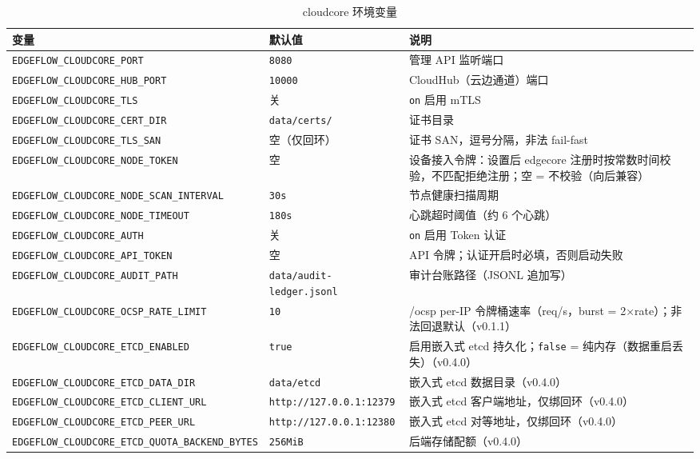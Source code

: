 \begin{table}[htbp]
\centering
\caption{cloudcore 环境变量}
\label{tab:a-cloud}
\begin{tabularx}{\textwidth}{l l X}
\toprule
\textbf{变量} & \textbf{默认值} & \textbf{说明} \\
\midrule
\texttt{EDGEFLOW\_CLOUDCORE\_PORT} & \texttt{8080} & 管理 API 监听端口 \\
\texttt{EDGEFLOW\_CLOUDCORE\_HUB\_PORT} & \texttt{10000} & CloudHub（云边通道）端口 \\
\texttt{EDGEFLOW\_CLOUDCORE\_TLS} & 关 & \texttt{on} 启用 mTLS \\
\texttt{EDGEFLOW\_CLOUDCORE\_CERT\_DIR} & \texttt{data/certs/} & 证书目录 \\
\texttt{EDGEFLOW\_CLOUDCORE\_TLS\_SAN} & 空（仅回环） & 证书 SAN，逗号分隔，非法 fail-fast \\
\texttt{EDGEFLOW\_CLOUDCORE\_NODE\_TOKEN} & 空 & 设备接入令牌：设置后 edgecore 注册时按常数时间校验，不匹配拒绝注册；空 = 不校验（向后兼容） \\
\texttt{EDGEFLOW\_CLOUDCORE\_NODE\_SCAN\_INTERVAL} & \texttt{30s} & 节点健康扫描周期 \\
\texttt{EDGEFLOW\_CLOUDCORE\_NODE\_TIMEOUT} & \texttt{180s} & 心跳超时阈值（约 6 个心跳） \\
\texttt{EDGEFLOW\_CLOUDCORE\_AUTH} & 关 & \texttt{on} 启用 Token 认证 \\
\texttt{EDGEFLOW\_CLOUDCORE\_API\_TOKEN} & 空 & API 令牌；认证开启时必填，否则启动失败 \\
\texttt{EDGEFLOW\_CLOUDCORE\_AUDIT\_PATH} & \texttt{data/audit-ledger.jsonl} & 审计台账路径（JSONL 追加写） \\
\texttt{EDGEFLOW\_CLOUDCORE\_OCSP\_RATE\_LIMIT} & \texttt{10} & /ocsp per-IP 令牌桶速率（req/s，burst = 2×rate）；非法回退默认（v0.1.1） \\
\texttt{EDGEFLOW\_CLOUDCORE\_ETCD\_ENABLED} & \texttt{true} & 启用嵌入式 etcd 持久化；\texttt{false} = 纯内存（数据重启丢失）（v0.4.0） \\
\texttt{EDGEFLOW\_CLOUDCORE\_ETCD\_DATA\_DIR} & \texttt{data/etcd} & 嵌入式 etcd 数据目录（v0.4.0） \\
\texttt{EDGEFLOW\_CLOUDCORE\_ETCD\_CLIENT\_URL} & \texttt{http://127.0.0.1:12379} & 嵌入式 etcd 客户端地址，仅绑回环（v0.4.0） \\
\texttt{EDGEFLOW\_CLOUDCORE\_ETCD\_PEER\_URL} & \texttt{http://127.0.0.1:12380} & 嵌入式 etcd 对等地址，仅绑回环（v0.4.0） \\
\texttt{EDGEFLOW\_CLOUDCORE\_ETCD\_QUOTA\_BACKEND\_BYTES} & \texttt{256MiB} & 后端存储配额（v0.4.0） \\

\end{tabularx}
\end{table}
